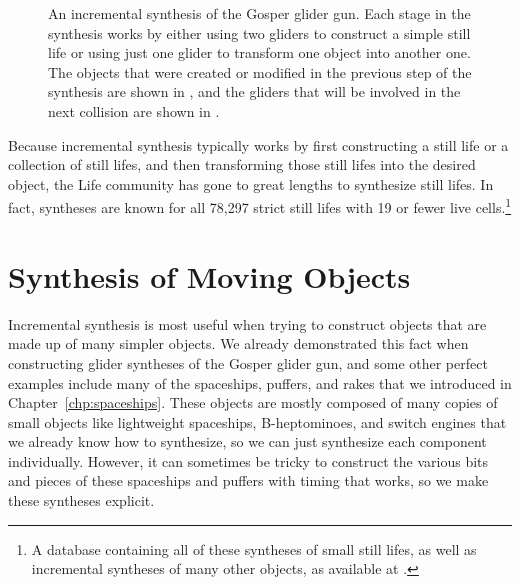 \begin{figure}[!htb]
	\centering
	
	\caption{An incremental synthesis of the Gosper glider gun. Each stage in the synthesis works by either using two gliders to construct a simple still life or using just one glider to transform one object into another one. The objects that were created or modified in the previous step of the synthesis are shown in , and the gliders that will be involved in the next collision are shown in .}\label{fig:gosper_sequential}
\end{figure}

Because incremental synthesis typically works by first constructing a still life or a collection of still lifes, and then transforming those still lifes into the desired object, the Life community has gone to great lengths to synthesize still lifes. In fact, syntheses are known for all 78,297 strict still lifes with 19 or fewer live cells.\footnote{A database containing all of these syntheses of small still lifes, as well as incremental syntheses of many other objects, as available at .}


\section{Synthesis of Moving Objects}\label{sec:incremental_synthesis_ships}

Incremental synthesis is most useful when trying to construct objects that are made up of many simpler objects. We already demonstrated this fact when constructing glider syntheses of the Gosper glider gun, and some other perfect examples include many of the spaceships, puffers, and rakes that we introduced in Chapter~\ref{chp:spaceships}. These objects are mostly composed of many copies of small objects like lightweight spaceships, B-heptominoes, and switch engines that we already know how to synthesize, so we can just synthesize each component individually. However, it can sometimes be tricky to construct the various bits and pieces of these spaceships and puffers with timing that works, so we make these syntheses explicit. 


